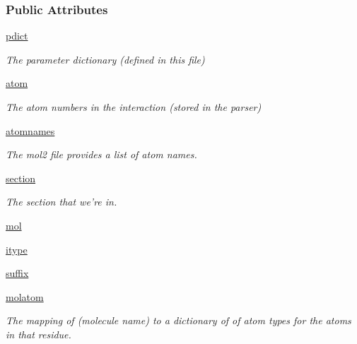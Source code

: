 \subsubsection*{\-Public \-Attributes}
\begin{DoxyCompactItemize}
\item 
\hyperlink{classforcebalance_1_1amberio_1_1Mol2__Reader_a638d61a7ff3ae5bd27d70a71f9b063ae}{pdict}
\begin{DoxyCompactList}\small\item\em \-The parameter dictionary (defined in this file) \end{DoxyCompactList}\item 
\hyperlink{classforcebalance_1_1amberio_1_1Mol2__Reader_ac6144080884f44ad7992e3045cb7a6fd}{atom}
\begin{DoxyCompactList}\small\item\em \-The atom numbers in the interaction (stored in the parser) \end{DoxyCompactList}\item 
\hyperlink{classforcebalance_1_1amberio_1_1Mol2__Reader_a0aface927f3f82bbedda69ad67d1e544}{atomnames}
\begin{DoxyCompactList}\small\item\em \-The mol2 file provides a list of atom names. \end{DoxyCompactList}\item 
\hyperlink{classforcebalance_1_1amberio_1_1Mol2__Reader_a254817197733eba261202aab64a1be3d}{section}
\begin{DoxyCompactList}\small\item\em \-The section that we're in. \end{DoxyCompactList}\item 
\hyperlink{classforcebalance_1_1amberio_1_1Mol2__Reader_a5a90933c3fd3796635b49fb5cfb80162}{mol}
\item 
\hyperlink{classforcebalance_1_1amberio_1_1Mol2__Reader_a1c0438775f378ea2b80b2571f388403e}{itype}
\item 
\hyperlink{classforcebalance_1_1amberio_1_1Mol2__Reader_a76b4f0ec6731d7072da6be5768ebf979}{suffix}
\item 
\hyperlink{classforcebalance_1_1amberio_1_1Mol2__Reader_acdeaabdae39b208fb9430ee4cd6de113}{molatom}
\begin{DoxyCompactList}\small\item\em \-The mapping of (molecule name) to a dictionary of of atom types for the atoms in that residue. \end{DoxyCompactList}\item 

\end{DoxyCompactItemize}

